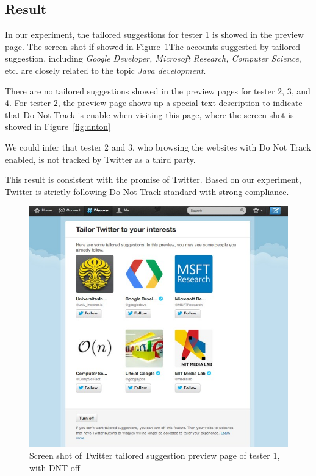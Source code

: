 \documentclass{sig-alternate}
\begin{document}
\subsection{Result} \label{sec:result}

In our experiment, the tailored suggestions for tester 1 is showed in the preview page. The screen shot if showed in Figure~\ref{fig:twitter}The accounts suggested by tailored suggestion, including \emph{Google Developer, Microsoft Research, Computer Science}, etc. are closely related to the topic \emph{Java development}. 

There are no tailored suggestions showed in the preview pages for tester 2, 3, and 4. For tester 2, the preview page shows up a special text description to indicate that Do Not Track is enable when visiting this page, where the screen shot is showed in Figure~\ref{fig:dnton}

We could infer that tester 2 and 3, who browsing the websites with Do Not Track enabled, is not tracked by Twitter as a third party.

This result is consistent with the promise of Twitter. Based on our experiment, Twitter is strictly following Do Not Track standard with strong compliance.
\begin{figure}
\begin{center}
\includegraphics[width=0.9\columnwidth]{twitter}
\end{center}
\caption{Screen shot of Twitter tailored suggestion preview page of tester 1, with DNT off}
\label{fig:twitter}
\end{figure}
\end{document}

